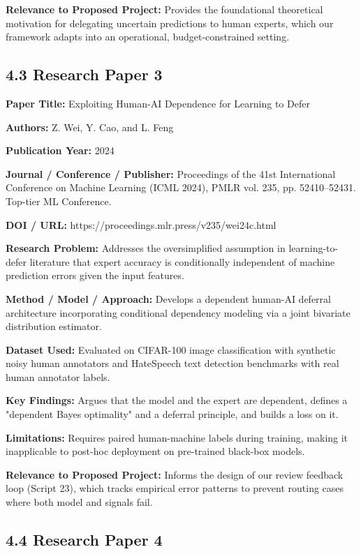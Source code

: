 \textbf{Relevance to Proposed Project:} Provides the foundational theoretical motivation for delegating uncertain predictions to human experts, which our framework adapts into an operational, budget-constrained setting.

\subsection{4.3 Research Paper 3}

\textbf{Paper Title:} Exploiting Human-AI Dependence for Learning to Defer

\textbf{Authors:} Z. Wei, Y. Cao, and L. Feng

\textbf{Publication Year:} 2024

\textbf{Journal / Conference / Publisher:} Proceedings of the 41st International Conference on Machine Learning (ICML 2024), PMLR vol. 235, pp. 52410--52431. Top-tier ML Conference.

\textbf{DOI / URL:} https://proceedings.mlr.press/v235/wei24c.html

\textbf{Research Problem:} Addresses the oversimplified assumption in learning-to-defer literature that expert accuracy is conditionally independent of machine prediction errors given the input features.

\textbf{Method / Model / Approach:} Develops a dependent human-AI deferral architecture incorporating conditional dependency modeling via a joint bivariate distribution estimator.

\textbf{Dataset Used:} Evaluated on CIFAR-100 image classification with synthetic noisy human annotators and HateSpeech text detection benchmarks with real human annotator labels.

\textbf{Key Findings:} Argues that the model and the expert are dependent, defines a "dependent Bayes optimality" and a deferral principle, and builds a loss on it.

\textbf{Limitations:} Requires paired human-machine labels during training, making it inapplicable to post-hoc deployment on pre-trained black-box models.

\textbf{Relevance to Proposed Project:} Informs the design of our review feedback loop (Script 23), which tracks empirical error patterns to prevent routing cases where both model and signals fail.

\subsection{4.4 Research Paper 4}

